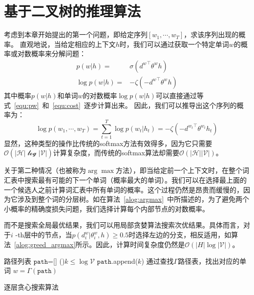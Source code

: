\section{基于二叉树的推理算法}
考虑到本章开始提出的第一个问题，即给定序列$ [w_1,\cdots,w_T] $，求该序列出现的概率。 直观地说，当给定相应的上下文$ h $时，我们可以通过获取一个特定单词$ w $的概率或对数概率来分解问题：
\begin{equation}
\begin{split}
    p(w|h) =&\sigma({d^w}^\top \theta^w h)\\
   \log p(w|h) =& -\zeta(- {d^{w}}^\top \theta^{w} h )
\end{split}
\end{equation}
其中概率$ p(w | h)$和单词$ w $的对数概率$ \log p(w | h)$可以直接通过等式~\ref{equ:pw}~和~\ref{equ:cost}~逐步计算出来。 因此，我们可以推导出这个序列的概率为：
\begin{equation}
   \log p(w_1,\cdots, w_T)=\sum_{t=1}^T\log p(w_t|h_t) = -\zeta(- {d^{w_t}}^\top \theta^{w_t} h_t )
\end{equation}
显然，这种类型的操作比传统的softmax方法有效得多，因为它只需要$\mathcal{O}(\mathcal {| H | \log| V |})$计算复杂度，而传统的softmax算法却需要$\mathcal{O}(\mathcal {| H || V |})$。

关于第二种情况（也被称为$\arg\max $方法），即当给定前一个上下文时，在整个词汇表中搜索最有可能的下一个单词（概率最大的单词）。我们可以在选择最上面的一个候选人之前计算词汇表中所有单词的概率。这个过程仍然是昂贵而缓慢的，因为它涉及到整个词的分层树。如在算法~\ref{alog:argmax}~中所描述的，为了避免两个小概率的精确度损失问题，我们选择计算每个内部节点的对数概率。

而不是搜索全局最优结果，我们可以用局部贪婪算法搜索次优结果。具体而言，对于$ i $ -th层中的节点，当$ p(d ^ w_i | \theta_{i} ^ w,h)\ge 0.5 $时选择左边的分支，相反适用，如算法~\ref{alog:greed_argmax}所示。因此，计算时间复杂度仍然是$ \mathcal{O}(| H | \log \mathcal {| V |})$。


\begin{algorithm}[!ht]
\SetAlgoLined
{}
 路径列表 $\mathtt{path}$=[] \;
\While(){$k \le \log \mathcal{V}$ }{
 $\mathtt{path}$.append($k$) 
}
{通过查找$\Gamma$路径表，找出对应的单词}\;
$w=\Gamma(\mathtt{path})$\;
\caption{逐层贪心搜索算法}\label{alog:greed_argmax}
\end{algorithm}

